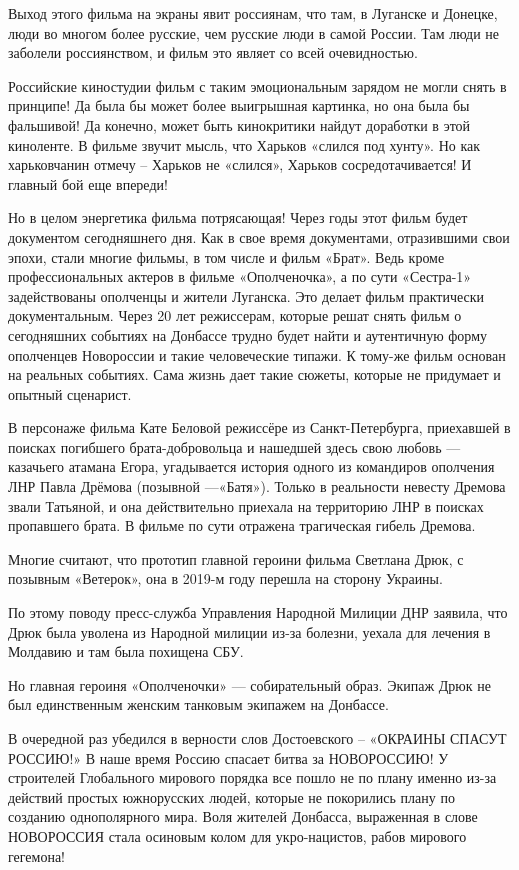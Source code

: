 Выход этого фильма на экраны явит россиянам, что там, в Луганске и Донецке,
люди во многом более русские, чем русские люди в самой России. Там люди не
заболели россиянством, и фильм это являет со всей очевидностью. 

Российские киностудии фильм с таким эмоциональным зарядом не могли снять в
принципе! Да была бы может более выигрышная картинка, но она была бы фальшивой!
Да конечно, может быть кинокритики найдут доработки в этой киноленте. В фильме
звучит мысль, что Харьков «слился под хунту». Но как харьковчанин отмечу –
Харьков не «слился», Харьков сосредотачивается! И главный бой еще впереди! 

Но в целом энергетика фильма потрясающая! Через годы этот фильм будет
документом сегодняшнего дня. Как в свое время документами, отразившими свои
эпохи, стали многие фильмы, в том числе и фильм «Брат». Ведь кроме
профессиональных актеров в фильме «Ополченочка», а по сути «Сестра-1»
задействованы ополченцы и жители Луганска. Это делает фильм практически
документальным. Через 20 лет режиссерам, которые решат снять фильм о
сегодняшних событиях на Донбассе трудно будет найти и аутентичную форму
ополченцев Новороссии и такие человеческие типажи. К тому-же фильм основан на
реальных событиях. Сама жизнь дает такие сюжеты, которые не придумает и опытный
сценарист. 

В персонаже фильма Кате Беловой режиссёре из Санкт-Петербурга, приехавшей в
поисках погибшего брата-добровольца и нашедшей здесь свою любовь — казачьего
атамана Егора, угадывается история одного из командиров ополчения ЛНР Павла
Дрёмова (позывной —«Батя»). Только в реальности невесту Дремова звали Татьяной,
и она действительно приехала на территорию ЛНР в поисках пропавшего брата. В
фильме по сути отражена трагическая гибель Дремова. 

Многие считают, что прототип главной героини фильма Светлана Дрюк, с позывным
«Ветерок», она в 2019-м году перешла на сторону Украины. 

По этому поводу пресс-служба Управления Народной Милиции ДНР заявила, что Дрюк
была уволена из Народной милиции из-за болезни, уехала для лечения в Молдавию и
там была похищена СБУ. 

Но главная героиня «Ополченочки» — собирательный образ. Экипаж Дрюк не был
единственным женским танковым экипажем на Донбассе. 

В очередной раз убедился в верности слов Достоевского – «ОКРАИНЫ СПАСУТ
РОССИЮ!» В наше время Россию спасает битва за НОВОРОССИЮ! У строителей
Глобального мирового порядка все пошло не по плану именно из-за действий
простых южнорусских людей, которые не покорились плану по созданию
однополярного мира. Воля жителей Донбасса, выраженная в слове НОВОРОССИЯ стала
осиновым колом для укро-нацистов, рабов мирового гегемона! 

